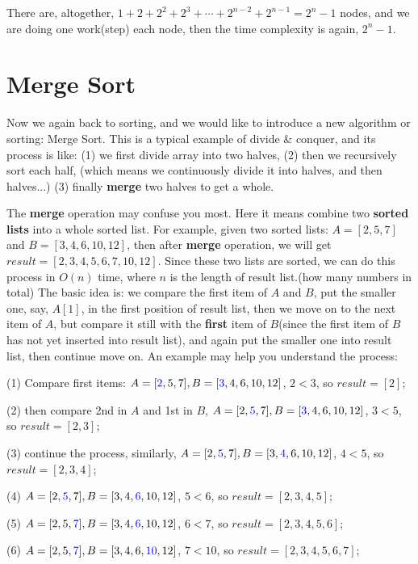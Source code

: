 \documentclass[11pt, a4paper]{COMP3711}
\begin{document}
\begin{spacing}{1.5}
    There are, altogether, $1+2+2^2+2^3+\cdots + 2^{n-2}+2^{n-1}
    =2^n-1$ nodes, and we are doing one work(step) each node,
    then the time complexity is again, $2^n-1$.

    \section{Merge Sort}

    Now we again back to sorting, and we would like to introduce 
    a new algorithm or sorting: Merge Sort.
    This is a typical example of divide \& conquer, and 
    its process is like: (1) we first divide array into two halves,
    (2) then we recursively sort each half, (which means we 
    continuously divide it into halves, and then halves...)
    (3) finally {\bf merge} two halves to get a whole.

    The {\bf merge} operation may confuse you most. Here 
    it means combine two {\bf sorted lists} into a 
    whole sorted list. For example, given two sorted lists:
    $A=[2, 5, 7]$ and $B=[3, 4, 6, 10, 12]$, then after {\bf merge}
    operation, we will get $result=[2, 3, 4, 5, 6, 7, 10, 12]$.
    Since these two lists are sorted, we can do this process
    in $O(n)$ time, where $n$ is the length of result 
    list.(how many numbers in total) The basic idea is: 
    we compare the first item of $A$ and $B$, put the smaller 
    one, say, $A[1]$, in the first position of result list, then 
    we move on to the next item of $A$, but compare it still with 
    the {\bf first} item of $B$(since the first item of $B$
    has not yet inserted into result list), 
    and again put the smaller one into result list, then 
    continue move on. An example may help you understand the process:

    (1) Compare first items: $A=[{\color{blue} 2},5,7], B=[{\color{blue} 3},4,6,10,12]$, 
    $2<3$, so $result=[2]$;

    (2) then compare 2nd in $A$ and 1st in $B$, $A=[2, {\color{blue} 5},7], B=[{\color{blue} 3},4,6,10,12]$, 
    $3<5$, so $result=[2, 3]$;

    (3) continue the process, similarly, $A=[2, {\color{blue} 5},7], B=[3,{\color{blue} 4},6,10,12]$, 
    $4<5$, so $result=[2, 3, 4]$;

    (4) $A=[2, {\color{blue} 5},7], B=[3,4,{\color{blue} 6},10,12]$, 
    $5<6$, so $result=[2, 3, 4, 5]$;

    (5) $A=[2, 5,{\color{blue} 7}], B=[3,4,{\color{blue} 6},10,12]$, 
    $6<7$, so $result=[2, 3, 4, 5, 6]$;

    (6) $A=[2, 5,{\color{blue} 7}], B=[3,4,6,{\color{blue} 10},12]$, 
    $7<10$, so $result=[2, 3, 4, 5, 6, 7]$;


\end{spacing}
\end{document}
